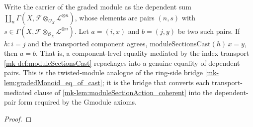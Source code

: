 \begin{lemma}\label{mk-lem:moduleGradedMonoid_eq_of_cast}
  \leanok

  Write the carrier of the graded module as the dependent sum
  \(\coprod_{n} \Gamma(X, \mathcal{F} \otimes_{\mathcal{O}_X} \mathcal{L}^{\otimes n})\),
  whose elements are pairs \((n, s)\) with
  \(s \in \Gamma(X, \mathcal{F} \otimes_{\mathcal{O}_X} \mathcal{L}^{\otimes n})\). Let
  \(a = (i, x)\) and \(b = (j, y)\) be two such pairs. If \(h : i = j\) and the
  transported component agrees, \(\mathrm{moduleSectionsCast}(h)\,x = y\), then
  \(a = b\). That is, a component-level equality mediated by the index transport
  \ref{mk-def:moduleSectionsCast} repackages into a genuine equality of dependent
  pairs. This is the twisted-module analogue of the ring-side bridge
  \ref{mk-lem:gradedMonoid_eq_of_cast}; it is the bridge that converts each
  transport-mediated clause of \ref{mk-lem:moduleSectionAction_coherent} into the
  dependent-pair form required by the \(\mathrm{Gmodule}\) axioms.
\end{lemma}

\begin{proof}
  \leanok

\end{proof}


